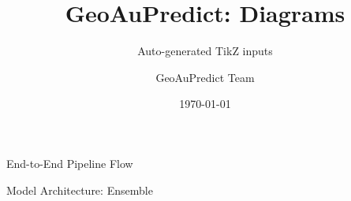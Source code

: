 \documentclass[aspectratio=169]{beamer}
\title{GeoAuPredict: Diagrams}
\subtitle{Auto-generated TikZ inputs}
\author{GeoAuPredict Team}
\date{\today}
\begin{document}
\frame{\titlepage}

\begin{frame}{End-to-End Pipeline Flow}
\centering
\resizebox{!}{0.78\textheight}{}
\end{frame}

\begin{frame}{Model Architecture: Ensemble}
\centering
\resizebox{\textwidth}{!}{}
\end{frame}
\end{document}
